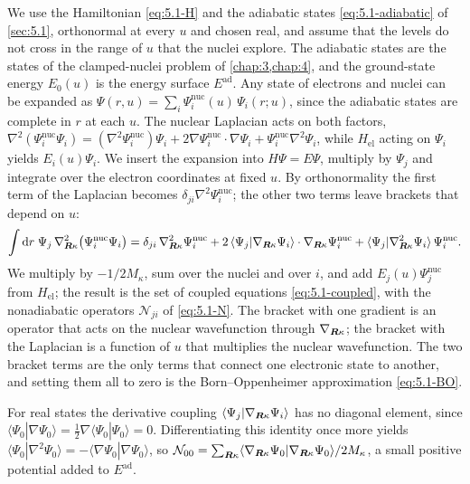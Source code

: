 We use the Hamiltonian \cref{eq:5.1-H} and the adiabatic states \cref{eq:5.1-adiabatic} of \cref{sec:5.1}, orthonormal at every $u$ and chosen real, and assume that the levels do not cross in the range of $u$ that the nuclei explore. The adiabatic states are the states of the clamped-nuclei problem of \cref{chap:3,chap:4}, and the ground-state energy $E_0(u)$ is the energy surface $E^{\mathrm{ad}}$. Any state of electrons and nuclei can be expanded as $\Psi(r,u) = \sum_i\Psi^{\mathrm{nuc}}_i(u)\,\Psi_i(r;u)$, since the adiabatic states are complete in $r$ at each $u$. The nuclear Laplacian acts on both factors, $\nabla^2(\Psi^{\mathrm{nuc}}_i\Psi_i) = (\nabla^2\Psi^{\mathrm{nuc}}_i)\Psi_i + 2\nabla\Psi^{\mathrm{nuc}}_i\cdot\nabla\Psi_i + \Psi^{\mathrm{nuc}}_i\nabla^2\Psi_i$, while $H_{\mathrm{el}}$ acting on $\Psi_i$ yields $E_i(u)\Psi_i$. We insert the expansion into $H\Psi = E\Psi$, multiply by $\Psi_j$ and integrate over the electron coordinates at fixed $u$. By orthonormality the first term of the Laplacian becomes $\delta_{ji}\nabla^2\Psi^{\mathrm{nuc}}_i$; the other two terms leave brackets that depend on $u$:
\begin{equation*}
  \int\mathrm{d} r\;\Psi_j\,\nabla^2_{\bm{R}\kappa}\bigl(\Psi^{\mathrm{nuc}}_i\Psi_i\bigr)
  = \delta_{ji}\,\nabla^2_{\bm{R}\kappa}\Psi^{\mathrm{nuc}}_i + 2\,\langle\Psi_j|\nabla_{\bm{R}\kappa}\Psi_i\rangle\cdot\nabla_{\bm{R}\kappa}\Psi^{\mathrm{nuc}}_i + \langle\Psi_j|\nabla^2_{\bm{R}\kappa}\Psi_i\rangle\,\Psi^{\mathrm{nuc}}_i .
\end{equation*}
We multiply by $-1/2M_\kappa$, sum over the nuclei and over $i$, and add $E_j(u)\Psi^{\mathrm{nuc}}_j$ from $H_{\mathrm{el}}$; the result is the set of coupled equations \cref{eq:5.1-coupled}, with the nonadiabatic operators $\mathcal{N}_{ji}$ of \cref{eq:5.1-N}. The bracket with one gradient is an operator that acts on the nuclear wavefunction through $\nabla_{\bm{R}\kappa}$; the bracket with the Laplacian is a function of $u$ that multiplies the nuclear wavefunction. The two bracket terms are the only terms that connect one electronic state to another, and setting them all to zero is the Born--Oppenheimer approximation \cref{eq:5.1-BO}.

For real states the derivative coupling $\langle\Psi_j|\nabla_{\bm{R}\kappa}\Psi_i\rangle$ has no diagonal element, since $\langle\Psi_0|\nabla\Psi_0\rangle = \tfrac12\nabla\langle\Psi_0|\Psi_0\rangle = 0$. Differentiating this identity once more yields $\langle\Psi_0|\nabla^2\Psi_0\rangle = -\langle\nabla\Psi_0|\nabla\Psi_0\rangle$, so $\mathcal{N}_{00} = \sum_{\bm{R}\kappa}\langle\nabla_{\bm{R}\kappa}\Psi_0|\nabla_{\bm{R}\kappa}\Psi_0\rangle/2M_\kappa$, a small positive potential added to $E^{\mathrm{ad}}$.

